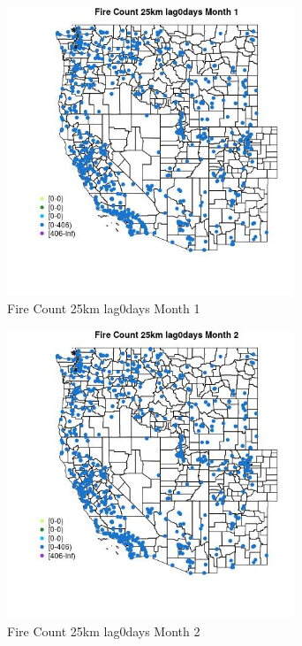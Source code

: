 \begin{figure} 
\centering  
\includegraphics[width=0.77\textwidth]{Code_Outputs/Report_ML_input_PM25_Step4_part_f_de_duplicated_aves_prioritize_24hr_obswNAs_MapObsMo1Fire_Count_25km_lag0days.jpg} 
\caption{\label{fig:Report_ML_input_PM25_Step4_part_f_de_duplicated_aves_prioritize_24hr_obswNAsMapObsMo1Fire_Count_25km_lag0days}Fire Count 25km lag0days Month 1} 
\end{figure} 
 

\begin{figure} 
\centering  
\includegraphics[width=0.77\textwidth]{Code_Outputs/Report_ML_input_PM25_Step4_part_f_de_duplicated_aves_prioritize_24hr_obswNAs_MapObsMo2Fire_Count_25km_lag0days.jpg} 
\caption{\label{fig:Report_ML_input_PM25_Step4_part_f_de_duplicated_aves_prioritize_24hr_obswNAsMapObsMo2Fire_Count_25km_lag0days}Fire Count 25km lag0days Month 2} 
\end{figure} 
 

